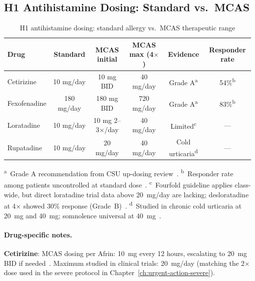 \subsection{H1 Antihistamine Dosing: Standard vs.\ MCAS}
\label{sec:h1-updosing}

\begin{table}[htbp]
\centering
\caption{H1 antihistamine dosing: standard allergy vs.\ MCAS therapeutic range}
\label{tab:h1-updosing}
\begin{tabular}{lccccc}
\toprule
\textbf{Drug} & \textbf{Standard} & \textbf{MCAS initial} & \textbf{MCAS max (4$\times$)} & \textbf{Evidence} & \textbf{Responder rate} \\
\midrule
Cetirizine & 10 mg/day & 10 mg BID & 40 mg/day & Grade A\textsuperscript{a} & 54\%\textsuperscript{b} \\
Fexofenadine & 180 mg/day & 180 mg BID & 720 mg/day & Grade A\textsuperscript{a} & 83\%\textsuperscript{b} \\
Loratadine & 10 mg/day & 10 mg 2--3$\times$/day & 40 mg/day & Limited\textsuperscript{c} & --- \\
Rupatadine & 10 mg/day & 20 mg/day & 40 mg/day & Cold urticaria\textsuperscript{d} & --- \\
\bottomrule
\end{tabular}

\vspace{0.5em}
{\footnotesize
\textsuperscript{a}~Grade A recommendation from CSU up-dosing review~\cite{Podder2023updosing}. \textsuperscript{b}~Responder rate among patients uncontrolled at standard dose~\cite{Podder2023updosing}. \textsuperscript{c}~Fourfold guideline applies class-wide, but direct loratadine trial data above 20~mg/day are lacking; desloratadine at 4$\times$ showed 30\% response (Grade~B)~\cite{Podder2023updosing}. \textsuperscript{d}~Studied in chronic cold urticaria at 20~mg and 40~mg; somnolence universal at 40~mg~\cite{Magerl2015rupatadine}.
}
\end{table}

\paragraph{Drug-specific notes.}

\textbf{Cetirizine}: MCAS dosing per Afrin: 10~mg every 12 hours, escalating to 20~mg BID if needed~\cite{Afrin2013MCAS}. Maximum studied in clinical trials: 20~mg/day (matching the 2$\times$ dose used in the severe protocol in Chapter~\ref{ch:urgent-action-severe}).

